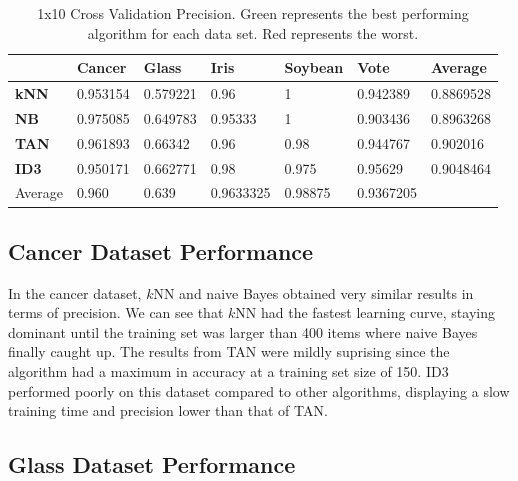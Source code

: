 \documentclass{article}
\begin{document}
		\begin{table}[h!] 
			\centering
			
			\begin{tabular}  { | l | l | l | l | l | l | l | }
				\hline
			\rowcolor{gray}	& \textbf{Cancer} & \textbf{Glass} & \textbf{Iris} & \textbf{Soybean} & \textbf{Vote} & Average \\
				\hline
				\cellcolor{gray} \textbf{kNN} & 0.953154  & \cellcolor{red}0.579221 & 0.96 & \cellcolor{green}1 & 0.942389 & \cellcolor{red}0.8869528  \\
				\hline
			\cellcolor{gray}	\textbf{NB} & \cellcolor{green}0.975085 & 0.649783 &\cellcolor{red} 0.95333 & \cellcolor{green}1 & \cellcolor{red}0.903436 & \cellcolor{lightgray}0.8963268   \\
				\hline
			\cellcolor{gray}	\textbf{TAN} & 0.961893 & \cellcolor{green}0.66342 & 0.96 & 0.98 & 0.944767 & \cellcolor{lightgray}0.902016 \\
				\hline
			\cellcolor{gray}	\textbf{ID3} & \cellcolor{red}0.950171 & 0.662771 & \cellcolor{green}0.98 & \cellcolor{red}0.975 & \cellcolor{green}0.95629 & \cellcolor{green}0.9048464 \\
				\hline
			\rowcolor{lightgray}	\cellcolor{gray} Average & 0.960 & 0.639 & 0.9633325 & 0.98875 & 0.9367205 & \\
				\hline
				
			\end{tabular}
			\caption{1x10 Cross Validation Precision. Green represents the best performing algorithm for each data set. Red represents the worst.}
			\label{table}
		\end{table}
		
		\subsection{Cancer Dataset Performance}
		
			In the cancer dataset, $k$NN and naive Bayes obtained very similar results in terms of precision. We can see that $k$NN had the fastest learning curve, staying dominant until the training set was larger than 400 items where naive Bayes finally caught up. The results from TAN were mildly suprising since the algorithm had a maximum in accuracy at a training set size of 150. ID3 performed poorly on this dataset compared to other algorithms, displaying a slow training time and precision lower than that of TAN.
		
		\subsection{Glass Dataset Performance}
		
\end{document}
